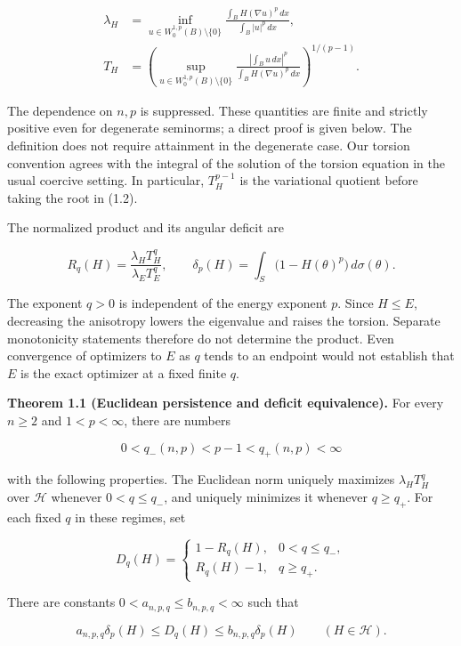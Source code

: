 \documentclass[11pt]{article}
\begin{document}
\[
\begin{aligned}
\lambda_H&=\inf_{u\in W^{1,p}_0(B)\setminus\{0\}}
\frac{\int_B H(\nabla u)^p\,dx}{\int_B|u|^p\,dx},\\
T_H&=\left(
\sup_{u\in W^{1,p}_0(B)\setminus\{0\}}
\frac{|\int_Bu\,dx|^p}{\int_BH(\nabla u)^p\,dx}
\right)^{1/(p-1)}.
\end{aligned}
\tag{1.2}
\]

The dependence on \(n,p\) is suppressed. These quantities are finite and
strictly positive even for degenerate seminorms; a direct proof is given
below. The definition does not require attainment in the degenerate
case. Our torsion convention agrees with the integral of the solution of
the torsion equation in the usual coercive setting. In particular,
\(T_H^{p-1}\) is the variational quotient before taking the root in
(1.2).

The normalized product and its angular deficit are

\[
R_q(H)=\frac{\lambda_H T_H^q}{\lambda_E T_E^q},
\qquad
\delta_p(H)=\int_S\bigl(1-H(\theta)^p\bigr)\,d\sigma(\theta).
\tag{1.3}
\]

The exponent \(q>0\) is independent of the energy exponent \(p\). Since
\(H\leq E\), decreasing the anisotropy lowers the eigenvalue and raises
the torsion. Separate monotonicity statements therefore do not determine
the product. Even convergence of optimizers to \(E\) as \(q\) tends to
an endpoint would not establish that \(E\) is the exact optimizer at a
fixed finite \(q\).

\textbf{Theorem 1.1 (Euclidean persistence and deficit equivalence).}
For every \(n\geq2\) and \(1<p<\infty\), there are numbers

\[
0<q_-(n,p)<p-1<q_+(n,p)<\infty
\tag{1.4}
\]

with the following properties. The Euclidean norm uniquely maximizes
\(\lambda_H T_H^q\) over \(\mathcal H\) whenever \(0<q\leq q_-\), and
uniquely minimizes it whenever \(q\geq q_+\). For each fixed \(q\) in
these regimes, set

\[
D_q(H)=
\begin{cases}
1-R_q(H),&0<q\leq q_-,\\
R_q(H)-1,&q\geq q_+.
\end{cases}
\tag{1.5}
\]

There are constants \(0<a_{n,p,q}\leq b_{n,p,q}<\infty\) such that

\[
a_{n,p,q}\delta_p(H)\leq D_q(H)
\leq b_{n,p,q}\delta_p(H)
\qquad(H\in\mathcal H).
\tag{1.6}
\]
\end{document}
